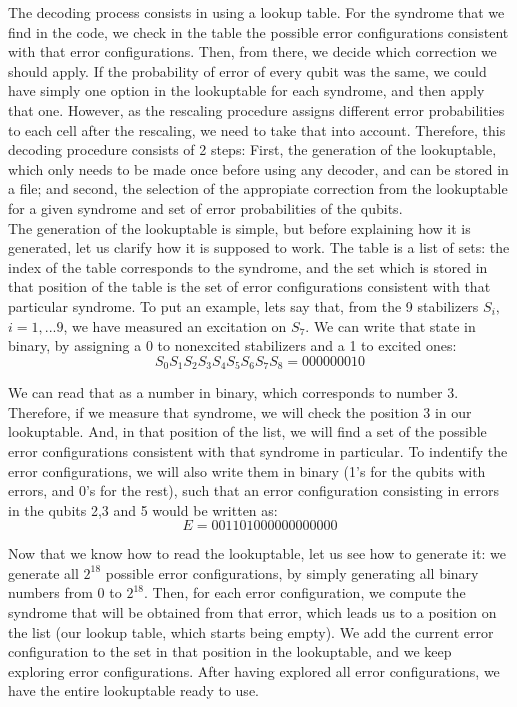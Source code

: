 \documentclass[a4paper,12pt]{article}
\begin{document}
The decoding process consists in using a lookup table. For the syndrome that we find in the code, we check in the table the possible error configurations consistent with that error configurations. Then, from there, we decide which correction we should apply. If the probability of error of every qubit was the same, we could have simply one option in the lookuptable for each syndrome, and then apply that one. However, as the rescaling procedure assigns different error probabilities to each cell after the rescaling, we need to take that into account. Therefore, this decoding procedure consists of 2 steps: First, the generation of the lookuptable, which only needs to be made once before using any decoder, and can be stored in a file; and second, the selection of the appropiate correction from the lookuptable for a given syndrome and set of error probabilities of the qubits.\\

The generation of the lookuptable is simple, but before explaining how it is generated, let us clarify how it is supposed to work. The table is a list of sets: the index of the table corresponds to the syndrome, and the set which is stored in that position of the table is the set of error configurations consistent with that particular syndrome. To put an example, lets say that, from the 9 stabilizers $S_i,$ $i=1,...9$, we have measured an excitation on $S_7$. We can write that state in binary, by assigning a 0 to nonexcited stabilizers and a 1 to excited ones: 
$$S_0S_1S_2S_3S_4S_5S_6S_7S_8=000000010$$

We can read that as a number in binary, which corresponds to number 3. Therefore, if we measure that syndrome, we will check the position 3 in our lookuptable. And, in that position of the list, we will find a set of the possible error configurations consistent with that syndrome in particular. To indentify the error configurations, we will also write them in binary (1's for the qubits with errors, and 0's for the rest), such that an error configuration consisting in errors in the qubits 2,3 and 5 would be written as:
$$E=001101000000000000$$


Now that we know how to read the lookuptable, let us see how to generate it: we generate all $2^18$ possible error configurations, by simply generating all binary numbers from 0 to $2^18$. Then, for each error configuration, we compute the syndrome that will be obtained from that error, which leads us to a position on the list (our lookup table, which starts being empty). We add the current error configuration to the set in that position in the lookuptable, and we keep exploring error configurations. After having explored all error configurations, we have the entire lookuptable ready to use. \\
\end{document}
